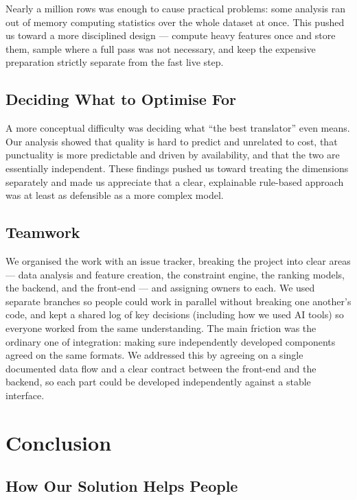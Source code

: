 \documentclass[9pt,a4paper,twoside]{utils/tau-class/tau}
\begin{document}
Nearly a million rows was enough to cause practical problems: some analysis ran out of memory computing statistics over the whole dataset at once. This pushed us toward a more disciplined design --- compute heavy features once and store them, sample where a full pass was not necessary, and keep the expensive preparation strictly separate from the fast live step.

\subsection{Deciding What to Optimise For}

A more conceptual difficulty was deciding what ``the best translator'' even means. Our analysis showed that quality is hard to predict and unrelated to cost, that punctuality is more predictable and driven by availability, and that the two are essentially independent. These findings pushed us toward treating the dimensions separately and made us appreciate that a clear, explainable rule-based approach was at least as defensible as a more complex model.

\subsection{Teamwork}

We organised the work with an issue tracker, breaking the project into clear areas --- data analysis and feature creation, the constraint engine, the ranking models, the backend, and the front-end --- and assigning owners to each. We used separate branches so people could work in parallel without breaking one another's code, and kept a shared log of key decisions (including how we used AI tools) so everyone worked from the same understanding. The main friction was the ordinary one of integration: making sure independently developed components agreed on the same formats. We addressed this by agreeing on a single documented data flow and a clear contract between the front-end and the backend, so each part could be developed independently against a stable interface.

\section{Conclusion}

\subsection{How Our Solution Helps People}
\end{document}
